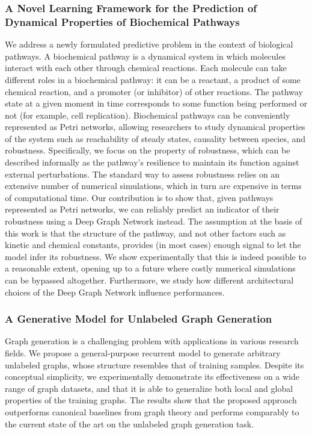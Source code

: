 \subsubsection*{A Novel Learning Framework for the Prediction of Dynamical Properties of Biochemical Pathways}
We address a newly formulated predictive problem in the context of biological pathways. A biochemical pathway is a dynamical system in which molecules interact with each other through chemical reactions. Each molecule can take different roles in a biochemical pathway: it can be a reactant, a product of some chemical reaction, and a promoter (or inhibitor) of other reactions. The pathway state at a given moment in time corresponds to some function being performed or not (for example, cell replication). Biochemical pathways can be conveniently represented as Petri networks, allowing researchers to study dynamical properties of the system such as reachability of steady states, causality between species, and robustness. Specifically, we focus on the property of robustness, which can be described informally as the pathway's resilience to maintain its function against external perturbations. The standard way to assess robustness relies on an extensive number of numerical simulations, which in turn are expensive in terms of computational time. Our contribution is to show that, given pathways represented as Petri networks, we can reliably predict an indicator of their robustness using a Deep Graph Network instead. The assumption at the basis of this work is that the structure of the pathway, and not other factors such as kinetic and chemical constants, provides (in most cases) enough signal to let the model infer its robustness. We show experimentally that this is indeed possible to a reasonable extent, opening up to a future where costly numerical simulations can be bypassed altogether. Furthermore, we study how different architectural choices of the Deep Graph Network influence performances.

\subsubsection*{A Generative Model for Unlabeled Graph Generation}
Graph generation is a challenging problem with applications in various research fields. We propose a general-purpose recurrent model to generate arbitrary unlabeled graphs, whose structure resembles that of training samples. Despite its conceptual simplicity, we experimentally demonstrate its effectiveness on a wide range of graph datasets, and that it is able to generalize both local and global properties of the training graphs. The results show that the proposed approach outperforms canonical baselines from graph theory and performs comparably to the current state of the art on the unlabeled graph generation task.

